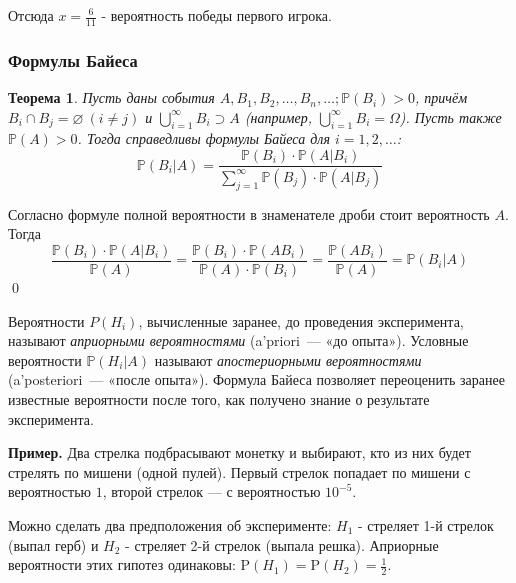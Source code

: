 \documentclass[oneside,final,14pt]{extreport}
\newcommand\myex{{\bf Пример.}}
\newcommand\myprob[1]{{\mathbb{P}(#1)}}
\renewenvironment{proof}{{\bfseries Доказательство.}}{\qed}
\newtheorem{thm}{Теорема}[section]
\theoremstyle{definition}
\begin{document}
Отсюда $x = \frac{6}{11}$ - вероятность победы первого игрока.

\subsubsection{Формулы Байеса}
\begin{thm}
    Пусть даны события $A, B_1, B_2, \ldots, B_n, \ldots; \myprob{B_i} > 0$, причём $B_i \cap B_j = \varnothing ~(i \neq j)$ и $\bigcup\limits_{i=1}^\infty B_i \supset A$ (например, $\bigcup\limits_{i=1}^{\infty}B_i = \Omega$). Пусть также $\myprob{A} > 0$. Тогда справедливы {\it формулы Байеса} для $i = 1, 2, \ldots$:
    \begin{equation*}
        \mathbb{P}\left(B_{i} | A\right)=\frac{\mathbb{P}\left(B_{i}\right) \cdot \mathbb{P}\left(A | B_{i}\right)}{\sum\limits_{j=1}^{\infty} \mathbb{P}\left(B_{j}\right) \cdot \mathbb{P}\left(A | B_{j}\right)}
    \end{equation*}
\end{thm}

\begin{proof}
    Согласно формуле полной вероятности в знаменателе дроби стоит вероятность $A$. Тогда
    \begin{equation*}
        \frac{\mathbb{P}\left(B_{i}\right) \cdot \mathbb{P}\left(A | B_{i}\right)}{\mathbb{P}(A)}=\frac{\mathbb{P}\left(B_{i}\right) \cdot \mathbb{P}\left(A B_{i}\right)}{\mathbb{P}(A) \cdot \mathbb{P}\left(B_{i}\right)}=\frac{\mathbb{P}\left(A B_{i}\right)}{\mathbb{P}(A)}=\mathbb{P}\left(B_{i} | A\right) 
    \end{equation*}
\end{proof}

Вероятности $P(H_i)$, вычисленные заранее, до проведения эксперимента, называют {\it априорными вероятностями} (a’priori~--- «до опыта»). Условные вероятности $\myprob{H_i | A}$ называют {\it апостериорными вероятностями} (a’posteriori~--- «после опыта»). Формула Байеса позволяет переоценить заранее известные вероятности после того, как получено знание о результате эксперимента.

\myex{} Два стрелка подбрасывают монетку и выбирают, кто из
них будет стрелять по мишени (одной пулей). Первый стрелок попадает по
мишени с вероятностью $1$, второй стрелок — с вероятностью $10^{-5}$.

Можно сделать два предположения об эксперименте: $H_1$ - стреляет 1-й
стрелок (выпал герб) и $H_2$ - стреляет 2-й стрелок (выпала решка). Априорные вероятности этих гипотез одинаковы: $\mathrm{P}\left(H_{1}\right)=\mathrm{P}\left(H_{2}\right)=\frac{1}{2}.$
\end{document}
